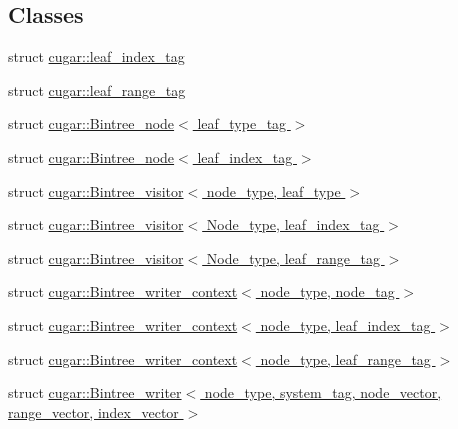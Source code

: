 \subsection*{Classes}
\begin{DoxyCompactItemize}
\item 
struct \hyperlink{structcugar_1_1leaf__index__tag}{cugar\+::leaf\+\_\+index\+\_\+tag}
\item 
struct \hyperlink{structcugar_1_1leaf__range__tag}{cugar\+::leaf\+\_\+range\+\_\+tag}
\item 
struct \hyperlink{structcugar_1_1_bintree__node}{cugar\+::\+Bintree\+\_\+node$<$ leaf\+\_\+type\+\_\+tag $>$}
\item 
struct \hyperlink{structcugar_1_1_bintree__node_3_01leaf__index__tag_01_4}{cugar\+::\+Bintree\+\_\+node$<$ leaf\+\_\+index\+\_\+tag $>$}
\item 
struct \hyperlink{structcugar_1_1_bintree__visitor}{cugar\+::\+Bintree\+\_\+visitor$<$ node\+\_\+type, leaf\+\_\+type $>$}
\item 
struct \hyperlink{structcugar_1_1_bintree__visitor_3_01_node__type_00_01leaf__index__tag_01_4}{cugar\+::\+Bintree\+\_\+visitor$<$ Node\+\_\+type, leaf\+\_\+index\+\_\+tag $>$}
\item 
struct \hyperlink{structcugar_1_1_bintree__visitor_3_01_node__type_00_01leaf__range__tag_01_4}{cugar\+::\+Bintree\+\_\+visitor$<$ Node\+\_\+type, leaf\+\_\+range\+\_\+tag $>$}
\item 
struct \hyperlink{structcugar_1_1_bintree__writer__context}{cugar\+::\+Bintree\+\_\+writer\+\_\+context$<$ node\+\_\+type, node\+\_\+tag $>$}
\item 
struct \hyperlink{structcugar_1_1_bintree__writer__context_3_01node__type_00_01leaf__index__tag_01_4}{cugar\+::\+Bintree\+\_\+writer\+\_\+context$<$ node\+\_\+type, leaf\+\_\+index\+\_\+tag $>$}
\item 
struct \hyperlink{structcugar_1_1_bintree__writer__context_3_01node__type_00_01leaf__range__tag_01_4}{cugar\+::\+Bintree\+\_\+writer\+\_\+context$<$ node\+\_\+type, leaf\+\_\+range\+\_\+tag $>$}
\item 
struct \hyperlink{structcugar_1_1_bintree__writer}{cugar\+::\+Bintree\+\_\+writer$<$ node\+\_\+type, system\+\_\+tag, node\+\_\+vector, range\+\_\+vector, index\+\_\+vector $>$}
\end{DoxyCompactItemize}
